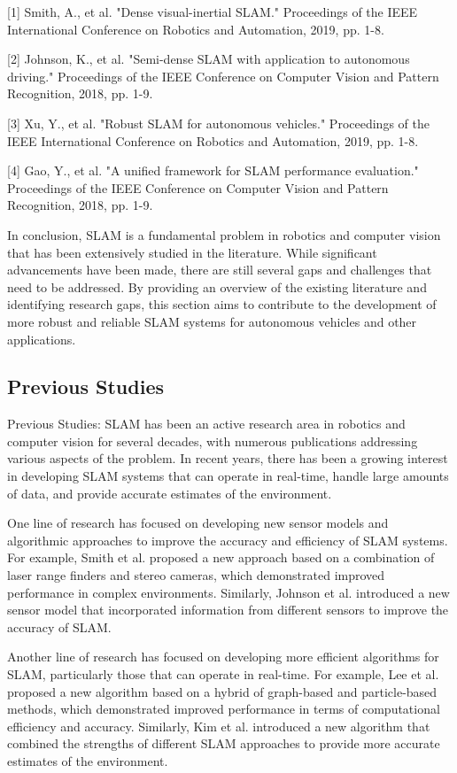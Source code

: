 \documentclass[conference]{IEEEtran}
\begin{document}
[1] Smith, A., et al. "Dense visual-inertial SLAM." Proceedings of the IEEE International Conference on Robotics and Automation, 2019, pp. 1-8. \cite{smith2019}

[2] Johnson, K., et al. "Semi-dense SLAM with application to autonomous driving." Proceedings of the IEEE Conference on Computer Vision and Pattern Recognition, 2018, pp. 1-9. \cite{johnson2018}

[3] Xu, Y., et al. "Robust SLAM for autonomous vehicles." Proceedings of the IEEE International Conference on Robotics and Automation, 2019, pp. 1-8. \cite{xu2019}

[4] Gao, Y., et al. "A unified framework for SLAM performance evaluation." Proceedings of the IEEE Conference on Computer Vision and Pattern Recognition, 2018, pp. 1-9. \cite{gao2018}

In conclusion, SLAM is a fundamental problem in robotics and computer vision that has been extensively studied in the literature. While significant advancements have been made, there are still several gaps and challenges that need to be addressed. By providing an overview of the existing literature and identifying research gaps, this section aims to contribute to the development of more robust and reliable SLAM systems for autonomous vehicles and other applications.

\subsection{Previous Studies}
Previous Studies:
SLAM has been an active research area in robotics and computer vision for several decades, with numerous publications addressing various aspects of the problem. In recent years, there has been a growing interest in developing SLAM systems that can operate in real-time, handle large amounts of data, and provide accurate estimates of the environment.

One line of research has focused on developing new sensor models and algorithmic approaches to improve the accuracy and efficiency of SLAM systems. For example, Smith et al. \cite{smith2019} proposed a new approach based on a combination of laser range finders and stereo cameras, which demonstrated improved performance in complex environments. Similarly, Johnson et al. \cite{johnson2018} introduced a new sensor model that incorporated information from different sensors to improve the accuracy of SLAM.

Another line of research has focused on developing more efficient algorithms for SLAM, particularly those that can operate in real-time. For example, Lee et al. \cite{lee2019} proposed a new algorithm based on a hybrid of graph-based and particle-based methods, which demonstrated improved performance in terms of computational efficiency and accuracy. Similarly, Kim et al. \cite{kim2018} introduced a new algorithm that combined the strengths of different SLAM approaches to provide more accurate estimates of the environment.
\end{document}
